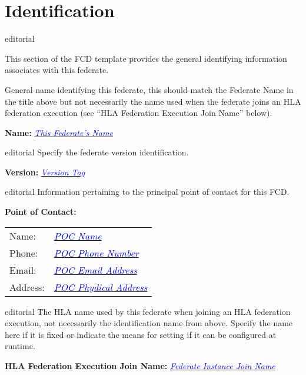 \documentclass[11pt,english,letterpaper]{article}
\newcommand{\example}[1]{{\textcolor{blue}{\textit{#1}}}}
\begin{document}
\section*{Identification}

\begin{shownto}{editorial}
{\color{red} This section of the FCD template provides the general identifying
information associates with this federate.

General name identifying this federate, this should match the
\textlangle{}Federate Name\textrangle{} in the title above but not necessarily
the name used when the federate joins an HLA federation execution (see ``HLA
Federation Execution Join Name'' below).}
\end{shownto}

\textbf{Name: } \underline{\example{This Federate's Name}}

\begin{shownto}{editorial}
{\color{red} Specify the federate version identification.}
\end{shownto}

\textbf{Version: } \underline{\example{Version Tag}}

\begin{shownto}{editorial}
{\color{red} Information pertaining to the principal point of contact for
this FCD.}
\end{shownto}

\textbf{Point of Contact: }

\hspace{0.25in}
\begin{tabularx}{\textwidth}{lX}
Name:    & \underline{\example{POC Name}} \\
Phone:   & \underline{\example{POC Phone Number}} \\
Email:   & \underline{\example{POC Email Address}} \\
Address: & \underline{\example{POC Phydical Address}}
\end{tabularx}

\begin{shownto}{editorial}
{\color{red} The HLA name used by this federate when joining an HLA federation
execution, not necessarily the identification name from above. Specify the
name here if it is fixed or indicate the means for setting if it can be
configured at runtime.}
\end{shownto}

\textbf{HLA Federation Execution Join Name: } \underline{\example{Federate Instance Join Name}}
\end{document}
